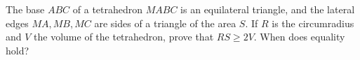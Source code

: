 The base $ABC$ of a tetrahedron $MABC$ is an equilateral triangle, and the lateral edges $MA,MB,MC$ are sides of a triangle of the area $S$. If $R$ is the circumradius and $V$ the volume of the tetrahedron, prove that $RS\ge2V$. When does equality hold?